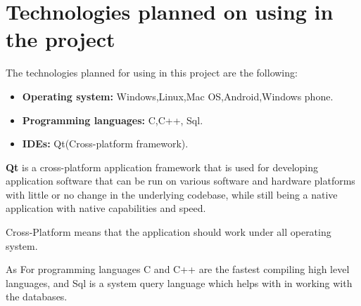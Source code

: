 \section{Technologies planned on using in the project}
The technologies planned for using in this project are the following:
\begin{itemize}
\item \textbf{Operating system:} Windows,Linux,Mac OS,Android,Windows phone.
\item \textbf{Programming languages:} C,C++, Sql.
\item \textbf{IDEs:} Qt(Cross-platform framework).
\end{itemize}
\textbf{Qt} is a cross-platform application framework that is used for developing application software that can be run on various software and hardware platforms with little or no change in the underlying codebase, while still being a native application with native capabilities and speed.\par
Cross-Platform means that the application should work under all operating system.\par
As For programming languages C and C++ are the fastest compiling high level languages, and Sql is a system query language which helps with in working with the databases.
\clearpage